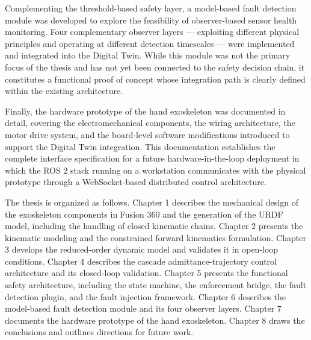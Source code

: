 Complementing the threshold-based safety layer, a model-based fault detection module was developed to explore the feasibility of observer-based sensor health monitoring. Four complementary observer layers — exploiting different physical principles and operating at different detection timescales — were implemented and integrated into the Digital Twin. While this module was not the primary focus of the thesis and has not yet been connected to the safety decision chain, it constitutes a functional proof of concept whose integration path is clearly defined within the existing architecture.
 
Finally, the hardware prototype of the hand exoskeleton was documented in detail, covering the electromechanical components, the wiring architecture, the motor drive system, and the board-level software modifications introduced to support the Digital Twin integration. This documentation establishes the complete interface specification for a future hardware-in-the-loop deployment in which the ROS 2 stack running on a workstation communicates with the physical prototype through a WebSocket-based distributed control architecture.
 
The thesis is organized as follows. Chapter 1 describes the mechanical design of the exoskeleton components in Fusion 360 and the generation of the URDF model, including the handling of closed kinematic chains. Chapter 2 presents the kinematic modeling and the constrained forward kinematics formulation. Chapter 3 develops the reduced-order dynamic model and validates it in open-loop conditions. Chapter 4 describes the cascade admittance-trajectory control architecture and its closed-loop validation. Chapter 5 presents the functional safety architecture, including the state machine, the enforcement bridge, the fault detection plugin, and the fault injection framework. Chapter 6 describes the model-based fault detection module and its four observer layers. Chapter 7 documents the hardware prototype of the hand exoskeleton. Chapter 8 draws the conclusions and outlines directions for future work.